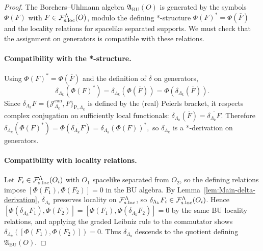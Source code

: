 
\begin{proof}
The Borchers--Uhlmann algebra $\mathfrak A_{\mathrm{BU}}(O)$ is generated by the
symbols $\Phi(F)$ with $F\in\mathcal F_{\mathrm{s.loc}}^\Lambda(O)$, modulo the defining *-structure
$\Phi(F)^*=\Phi(\overline F)$ and the locality relations for spacelike separated
supports.  We must check that the assignment on generators is compatible with
these relations.

\paragraph{Compatibility with the *-structure.}
Using $\Phi(F)^*=\Phi(\overline F)$ and the definition of $\delta$ on
generators,
\[
\delta_{\Lambda_k}(\Phi(F)^*)
=\delta_{\Lambda_k}(\Phi(\overline F))
=\Phi(\delta_{\Lambda_k}(\overline F)).
\]
Since \(\delta_{\Lambda_k} F=\{\mathcal J^{\mathrm{can}}_{\Lambda_k},F\}_{\mathrm P,\Lambda_k}\) is defined by the (real)
Peierls bracket, it respects complex conjugation on sufficiently local
functionals: \(\delta_{\Lambda_k}(\overline F)=\overline{\delta_{\Lambda_k}F}\).  Therefore
$
\delta_{\Lambda_k}(\Phi(F)^*)=\Phi(\overline{\delta_{\Lambda_k}F})=\delta_{\Lambda_k}(\Phi(F))^*,
$
so \(\delta_{\Lambda_k}\) is a *-derivation on generators.

\paragraph{Compatibility with locality relations.}
Let $F_i\in\mathcal F_{\mathrm{s.loc}}^\Lambda(O_i)$ with $O_1$ spacelike separated from $O_2$, so the defining
relations impose $[\Phi(F_1),\Phi(F_2)]=0$ in the BU algebra.
By Lemma~\ref{lem:Main-delta-derivation}, \(\delta_{\Lambda_k}\) preserves locality on \(\mathcal F_{\mathrm{s.loc}}^\Lambda\),
so \(\delta_{\Lambda_k} F_i\in\mathcal F_{\mathrm{s.loc}}^\Lambda(O_i)\).
Hence \( [\Phi(\delta_{\Lambda_k} F_1),\Phi(F_2)]=[\Phi(F_1),\Phi(\delta_{\Lambda_k} F_2)]=0 \) by the same
BU locality relations, and applying the graded Leibniz rule to the commutator
shows \(\delta_{\Lambda_k}([\Phi(F_1),\Phi(F_2)])=0\).  Thus \(\delta_{\Lambda_k}\) descends to the quotient
defining $\mathfrak A_{\mathrm{BU}}(O)$.


\end{proof}
